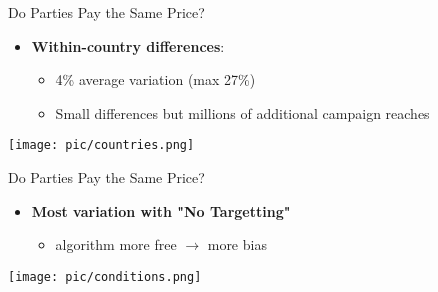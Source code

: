 \documentclass[
  ignorenonframetext,
]{beamer}
\begin{document}
\begin{frame}{Do Parties Pay the Same Price?}
\label{do-parties-pay-the-same-price-1}
\begin{itemize}
  \item \textbf{Within-country differences}:
\begin{itemize}
   \item 4\% average variation (max 27\%)
   \item Small differences but millions of additional campaign reaches
\end{itemize}
\end{itemize}

\begin{center}
    \texttt{[image: pic/countries.png]}
\end{center}
\end{frame}

\begin{frame}{Do Parties Pay the Same Price?}
\label{do-parties-pay-the-same-price-2}
\begin{itemize}
\item \textbf{Most variation with "No Targetting"}
\begin{itemize}
  \item algorithm more free $\rightarrow$ more bias
\end{itemize}
\end{itemize}

\vspace{.5cm}

\begin{center}
    \texttt{[image: pic/conditions.png]}
\end{center}
\end{frame}
\end{document}
